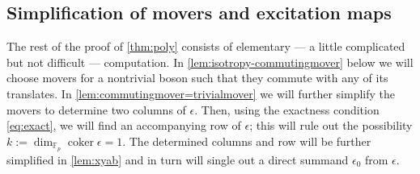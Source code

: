 \documentclass[aps,pra,
floatfix,notitlepage,
nofootinbib,
longbibliography,11pt]{revtex4-1}
\theoremstyle{definition}
\newcommand{\FF}{{\mathbb{F}}}
\DeclareMathOperator{\coker}{\mathrm{coker}}
\begin{document}
\subsection{Simplification of movers and excitation maps}

The rest of the proof of \cref{thm:poly} consists of elementary 
--- a little complicated but not difficult --- computation.
In \cref{lem:isotropy-commutingmover} below
we will choose movers for a nontrivial boson such that they commute with any of its translates.
In \cref{lem:commutingmover=trivialmover}
we will further simplify the movers to determine two columns of $\epsilon$.
Then, using the exactness condition \cref{eq:exact},
we will find an accompanying row of $\epsilon$;
this will rule out the possibility $k := \dim_{\FF_p} \coker \epsilon = 1$.
The determined columns and row will be further simplified in \cref{lem:xyab}
and in turn will single out a direct summand $\epsilon_0$ from $\epsilon$.
\end{document}
